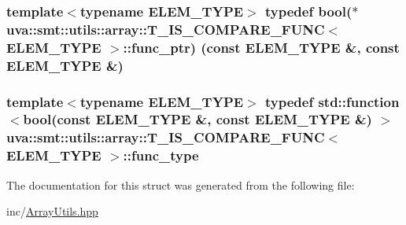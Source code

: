 \subsubsection[{func\+\_\+ptr}]{\setlength{\rightskip}{0pt plus 5cm}template$<$typename E\+L\+E\+M\+\_\+\+T\+Y\+P\+E$>$ typedef bool($\ast$  {\bf uva\+::smt\+::utils\+::array\+::\+T\+\_\+\+I\+S\+\_\+\+C\+O\+M\+P\+A\+R\+E\+\_\+\+F\+U\+N\+C}$<$ E\+L\+E\+M\+\_\+\+T\+Y\+P\+E $>$\+::func\+\_\+ptr) (const E\+L\+E\+M\+\_\+\+T\+Y\+P\+E \&, const E\+L\+E\+M\+\_\+\+T\+Y\+P\+E \&)}\label{structuva_1_1smt_1_1utils_1_1array_1_1_t___i_s___c_o_m_p_a_r_e___f_u_n_c_a931202e466e2b3ed5f175cf22970a47a}
\hypertarget{structuva_1_1smt_1_1utils_1_1array_1_1_t___i_s___c_o_m_p_a_r_e___f_u_n_c_a276e185a47597f5cc1c063627a49b9c0}{}
\subsubsection[{func\+\_\+type}]{\setlength{\rightskip}{0pt plus 5cm}template$<$typename E\+L\+E\+M\+\_\+\+T\+Y\+P\+E$>$ typedef std\+::function$<$bool(const E\+L\+E\+M\+\_\+\+T\+Y\+P\+E \&, const E\+L\+E\+M\+\_\+\+T\+Y\+P\+E \&) $>$ {\bf uva\+::smt\+::utils\+::array\+::\+T\+\_\+\+I\+S\+\_\+\+C\+O\+M\+P\+A\+R\+E\+\_\+\+F\+U\+N\+C}$<$ E\+L\+E\+M\+\_\+\+T\+Y\+P\+E $>$\+::{\bf func\+\_\+type}}\label{structuva_1_1smt_1_1utils_1_1array_1_1_t___i_s___c_o_m_p_a_r_e___f_u_n_c_a276e185a47597f5cc1c063627a49b9c0}


The documentation for this struct was generated from the following file\+:\begin{DoxyCompactItemize}
\item 
inc/\hyperlink{_array_utils_8hpp}{Array\+Utils.\+hpp}\end{DoxyCompactItemize}
